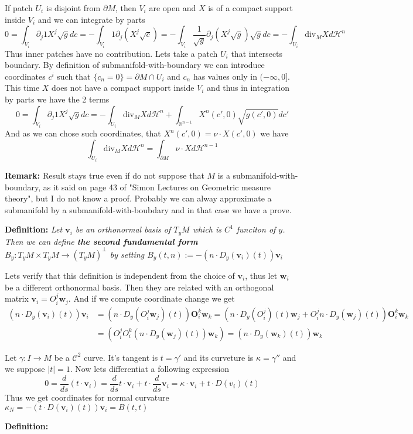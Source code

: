 \vspace{1ex}
If patch $U_i$ is disjoint from $\partial M$, then $V_i$ are open and $X$ is of
a compact support inside $V_i$ and we can integrate by parts
\[0=\int_{V_i}\partial_j 1X^j\sqrt gdc=-\int_{V_i}1\partial_j(X^j\sqrt c)=
-\int_{V_i}\frac{1}{\sqrt g}\partial_j(X^j\sqrt g)\sqrt gdc=-\int_{U_i}\text{div}_M Xd\mathcal H^n\]
Thus inner patches have no contribution. Lets take a patch $U_i$ that intersects
boundary. By definition of submanifold-with-boundary we can introduce coordinates
$c^i$ such that $\{c_n=0\}=\partial M\cap U_i$ and $c_n$ has values only in
$(-\infty,0]$. This time $X$ does not have a compact support inside $V_i$ and
thus in integration by parts we have the 2 terms
\[0=\int_{V_i}\partial_j 1X^j\sqrt gdc=-\int_{U_i}\text{div}_M Xd\mathcal H^n+\int_{\mathbb R^{n-1}}X^n(c',0)\sqrt{g(c',0)}dc'\]
And as we can chose such coordinates, that $X^n(c',0)=\nu\cdot X(c',0)$ we have
\[\int_{U_i}\text{div}_M Xd\mathcal H^n=\int_{\partial M}\nu\cdot Xd\mathcal H^{n-1}\]

\vspace{2ex}
\textbf{Remark:} Result stays true even if do not suppose that $M$ is a
submanifold-with-boundary, as it said on page 43 of "Simon Lectures on
Geometric measure theory", but I do not know a proof. Probably we can alway
approximate a submanifold by a submanifold-with-boubdary and in that case
we have a prove.

\vspace{2ex}
\textbf{Definition:} \textit{Let $\mathbf{v}_i$ be an orthonormal basis of $T_yM$ which
is $C^1$ funciton of $y$. Then we can define \textbf{the second fundamental form}
$B_y:T_yM\times T_yM\rightarrow (T_yM)^\perp$ by setting $B_y(t,n):=-(n\cdot D_y
(\mathbf v_i)(t))\mathbf v_i$
}

\vspace{2ex} Lets verify that this definition is independent from the choice of
$\mathbf v_i$, thus let $\mathbf w_i$ be a different orthonormal basis. Then
they are related with an orthogonal matrix $\mathbf v_i=O_i^j\mathbf w_j$. And
if we compute coordinate change we get
\begin{align*}
    (n\cdot D_y(\mathbf v_i)(t))\mathbf v_i&=(n\cdot D_y(O_i^j\mathbf w_j)(t))\mathbf O_i^k\mathbf w_k
=(n\cdot D_y(O_i^j)(t)\mathbf w_j + O_i^j n\cdot D_y(\mathbf w_j)(t))\mathbf O_i^k\mathbf w_k\\
    &=(O_i^jO_i^k(n\cdot D_y(\mathbf w_j)(t))\mathbf w_k)=(n\cdot D_y(\mathbf w_k)(t))\mathbf w_k
\end{align*}

\vspace{2ex}
Let $\gamma:I\rightarrow M$ be a $\mathcal C^2$ curve. It's tangent is $t=\gamma'$
and its curveture is $\kappa=\gamma''$ and we suppose $|t|=1$. Now lets
differentiat a following expression
\[0=\frac{d}{ds}(t\cdot\mathbf v_i)=\frac{d}{ds}t\cdot\mathbf v_i+t\cdot\frac{d}{ds}\mathbf v_i=\kappa\cdot\mathbf v_i+t\cdot D(v_i)(t)\]
Thus we get coordinates for normal curvature
$\kappa_N = -(t\cdot D(\mathbf v_i)(t))\mathbf v_i=B(t,t)$

\vspace{2ex}
\textbf{Definition:}

